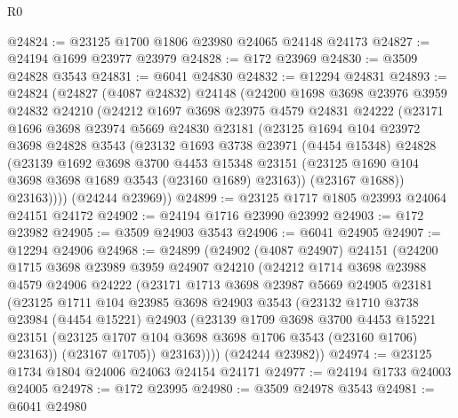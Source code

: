 \begin{lexlean}{R0}
\begin{coremodule}
@24824 := @23125 @1700 @1806 @23980 @24065 @24148 @24173
@24827 := @24194 @1699 @23977 @23979
@24828 := @172 @23969
@24830 := @3509 @24828 @3543
@24831 := @6041 @24830
@24832 := @12294 @24831
@24893 := @24824
    (@24827
      (@4087 @24832)
      @24148
      (@24200
        @1698
        @3698
        @23976
        @3959
        @24832
        @24210
        (@24212
          @1697
          @3698
          @23975
          @4579
          @24831
          @24222
          (@23171
            @1696
            @3698
            @23974
            @5669
            @24830
            @23181
            (@23125
              @1694
              @104
              @23972
              @3698
              @24828
              @3543
              (@23132
                @1693
                @3738
                @23971
                (@4454 @15348)
                @24828
                (@23139
                  @1692
                  @3698
                  @3700
                  @4453
                  @15348
                  @23151
                  (@23125 @1690 @104 @3698 @3698 @1689 @3543 (@23160 @1689) @23163))
                (@23167 @1688))
              @23163))))
      (@24244 @23969))
@24899 := @23125 @1717 @1805 @23993 @24064 @24151 @24172
@24902 := @24194 @1716 @23990 @23992
@24903 := @172 @23982
@24905 := @3509 @24903 @3543
@24906 := @6041 @24905
@24907 := @12294 @24906
@24968 := @24899
    (@24902
      (@4087 @24907)
      @24151
      (@24200
        @1715
        @3698
        @23989
        @3959
        @24907
        @24210
        (@24212
          @1714
          @3698
          @23988
          @4579
          @24906
          @24222
          (@23171
            @1713
            @3698
            @23987
            @5669
            @24905
            @23181
            (@23125
              @1711
              @104
              @23985
              @3698
              @24903
              @3543
              (@23132
                @1710
                @3738
                @23984
                (@4454 @15221)
                @24903
                (@23139
                  @1709
                  @3698
                  @3700
                  @4453
                  @15221
                  @23151
                  (@23125 @1707 @104 @3698 @3698 @1706 @3543 (@23160 @1706) @23163))
                (@23167 @1705))
              @23163))))
      (@24244 @23982))
@24974 := @23125 @1734 @1804 @24006 @24063 @24154 @24171
@24977 := @24194 @1733 @24003 @24005
@24978 := @172 @23995
@24980 := @3509 @24978 @3543
@24981 := @6041 @24980

\end{coremodule}
\end{lexlean}
